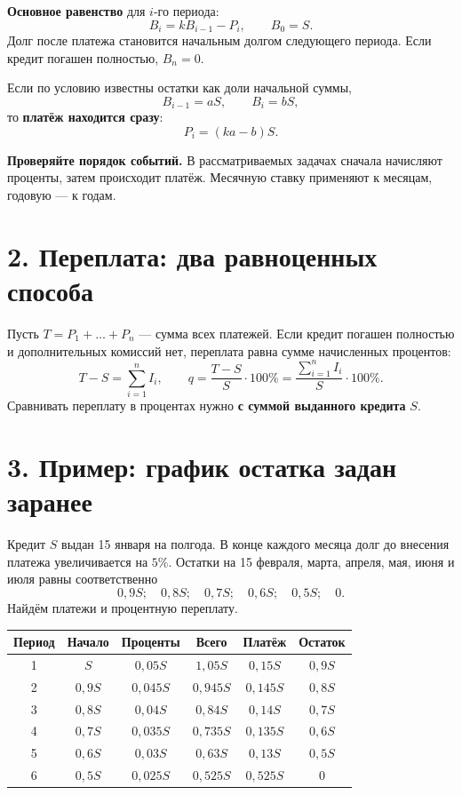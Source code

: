 \documentclass[a4paper,12pt]{article}
\newcommand{\key}[1]{\textcolor{darkaccent}{\textbf{#1}}}
\newcommand{\fboxeq}[1]{\[\boxed{#1}\]}
\begin{document}
\key{Основное равенство} для $i$-го периода:
\fboxeq{B_i=kB_{i-1}-P_i,\qquad B_0=S.}
Долг после платежа становится начальным долгом следующего периода. Если кредит погашен полностью, $B_n=0$.

Если по условию известны остатки как доли начальной суммы,
\[
B_{i-1}=aS,\qquad B_i=bS,
\]
то \key{платёж находится сразу}:
\fboxeq{P_i=(ka-b)S.}

\textbf{Проверяйте порядок событий.} В рассматриваемых задачах сначала начисляют проценты, затем происходит платёж. Месячную ставку применяют к месяцам, годовую --- к годам.

\section*{2. Переплата: два равноценных способа}

Пусть $T=P_1+\dots+P_n$ --- сумма всех платежей. Если кредит погашен полностью и дополнительных комиссий нет, переплата равна сумме начисленных процентов:
\[
T-S=\sum_{i=1}^{n}I_i,\qquad
q=\frac{T-S}{S}\cdot100\%=\frac{\sum_{i=1}^{n}I_i}{S}\cdot100\%.
\]
Сравнивать переплату в процентах нужно \key{с суммой выданного кредита} $S$.

\clearpage
\section*{3. Пример: график остатка задан заранее}

Кредит $S$ выдан 15 января на полгода. В конце каждого месяца долг до внесения платежа увеличивается на $5\%$. Остатки на 15 февраля, марта, апреля, мая, июня и июля равны соответственно
\[
0{,}9S;\quad 0{,}8S;\quad 0{,}7S;\quad
0{,}6S;\quad 0{,}5S;\quad 0.
\]
Найдём платежи и процентную переплату.

\begin{center}
\small
\renewcommand{\arraystretch}{1.42}
\begin{tabular}{@{}c c c c c c@{}}
\toprule
Период & Начало & Проценты & Всего & Платёж & Остаток \\
\midrule
1 & $S$ & $0{,}05S$ & $1{,}05S$ & $0{,}15S$ & $0{,}9S$ \\
2 & $0{,}9S$ & $0{,}045S$ & $0{,}945S$ & $0{,}145S$ & $0{,}8S$ \\
3 & $0{,}8S$ & $0{,}04S$ & $0{,}84S$ & $0{,}14S$ & $0{,}7S$ \\
4 & $0{,}7S$ & $0{,}035S$ & $0{,}735S$ & $0{,}135S$ & $0{,}6S$ \\
5 & $0{,}6S$ & $0{,}03S$ & $0{,}63S$ & $0{,}13S$ & $0{,}5S$ \\
6 & $0{,}5S$ & $0{,}025S$ & $0{,}525S$ & $0{,}525S$ & $0$ \\
\bottomrule
\end{tabular}
\end{center}
\end{document}
